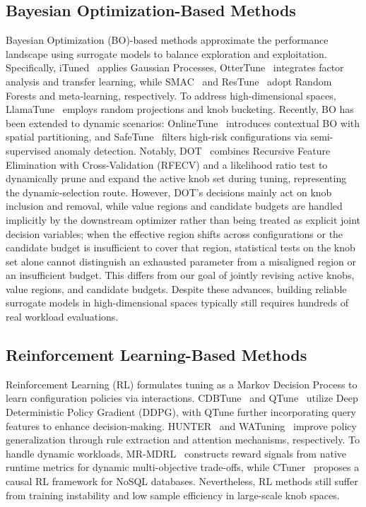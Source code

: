 \documentclass[runningheads]{llncs}
\begin{document}
\subsection{Bayesian Optimization-Based Methods}
Bayesian Optimization (BO)-based methods approximate the performance
landscape using surrogate models to balance exploration and exploitation.
Specifically, iTuned~\cite{ituned} applies Gaussian Processes,
OtterTune~\cite{ottertune} integrates factor analysis and transfer
learning, while SMAC~\cite{smac} and ResTune~\cite{restune} adopt Random
Forests and meta-learning, respectively. To address high-dimensional
spaces, LlamaTune~\cite{llamatune} employs random projections and knob
bucketing. Recently, BO has been extended to dynamic scenarios:
OnlineTune~\cite{onlinetune} introduces contextual BO with spatial
partitioning, and SafeTune~\cite{safetune} filters high-risk
configurations via semi-supervised anomaly detection. Notably,
DOT~\cite{dot} combines Recursive Feature Elimination with
Cross-Validation (RFECV) and a likelihood ratio test to dynamically prune
and expand the active knob set during tuning, representing the
dynamic-selection route. However, DOT's decisions mainly act on knob
inclusion and removal, while value regions and candidate budgets are
handled implicitly by the downstream optimizer rather than being treated
as explicit joint decision variables; when the effective region shifts
across configurations or the candidate budget is insufficient to cover
that region, statistical tests on the knob set alone cannot distinguish
an exhausted parameter from a misaligned region or an insufficient
budget. This differs from our goal of jointly revising active knobs,
value regions, and candidate budgets. Despite these advances, building
reliable surrogate models in high-dimensional spaces typically still
requires hundreds of real workload evaluations.

\subsection{Reinforcement Learning-Based Methods}
Reinforcement Learning (RL) formulates tuning as a Markov Decision
Process to learn configuration policies via interactions.
CDBTune~\cite{cdbtune} and QTune~\cite{qtune} utilize Deep Deterministic
Policy Gradient (DDPG), with QTune further incorporating query features
to enhance decision-making. HUNTER~\cite{hunter} and
WATuning~\cite{watuning} improve policy generalization through rule
extraction and attention mechanisms, respectively. To handle dynamic
workloads, MR-MDRL~\cite{mrmdrl} constructs reward signals from native
runtime metrics for dynamic multi-objective trade-offs, while
CTuner~\cite{ctuner} proposes a causal RL framework for NoSQL databases.
Nevertheless, RL methods still suffer from training instability and low
sample efficiency in large-scale knob spaces.
\end{document}
